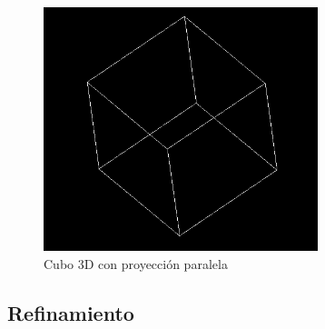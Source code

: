 \begin{figure}[h]
	\centering
	\includegraphics[width=8cm]{archivos/flatcube}
	\caption{Cubo 3D con proyección paralela}
	\label{fig:flatcube}
\end{figure}

\subsection{Refinamiento}

